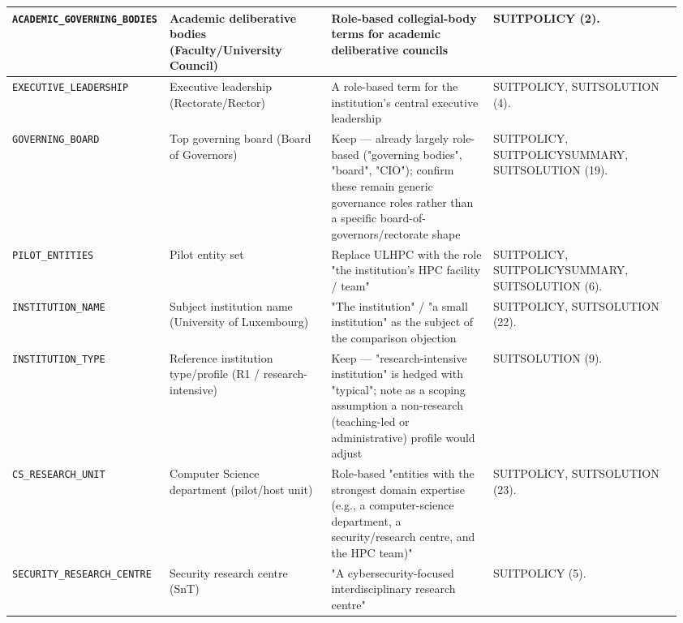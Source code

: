 \begin{center}
\begin{longtable}{@{}p{0.20\linewidth}p{0.24\linewidth}p{0.24\linewidth}p{0.28\linewidth}@{}}
\texttt{ACADEMIC\_GOVERNING\_BODIES} &
Academic deliberative bodies (Faculty/University Council) &
Role-based collegial-body terms for academic deliberative councils &
SUITPOLICY (2).\\
\midrule

\texttt{EXECUTIVE\_LEADERSHIP} &
Executive leadership (Rectorate/Rector) &
A role-based term for the institution's central executive leadership &
SUITPOLICY, SUITSOLUTION (4).\\
\midrule

\texttt{GOVERNING\_BOARD} &
Top governing board (Board of Governors) &
Keep --- already largely role-based ("governing bodies", "board", "CIO"); confirm these remain generic governance roles rather than a specific board-of-governors/rectorate shape &
SUITPOLICY, SUITPOLICYSUMMARY, SUITSOLUTION (19).\\
\midrule

\texttt{PILOT\_ENTITIES} &
Pilot entity set &
Replace ULHPC with the role "the institution's HPC facility / team" &
SUITPOLICY, SUITPOLICYSUMMARY, SUITSOLUTION (6).\\
\midrule

\texttt{INSTITUTION\_NAME} &
Subject institution name (University of Luxembourg) &
"The institution" / "a small institution" as the subject of the comparison objection &
SUITPOLICY, SUITSOLUTION (22).\\
\midrule

\texttt{INSTITUTION\_TYPE} &
Reference institution type/profile (R1 / research-intensive) &
Keep --- "research-intensive institution" is hedged with "typical"; note as a scoping assumption a non-research (teaching-led or administrative) profile would adjust &
SUITSOLUTION (9).\\
\midrule

\texttt{CS\_RESEARCH\_UNIT} &
Computer Science department (pilot/host unit) &
Role-based "entities with the strongest domain expertise (e.g., a computer-science department, a security/research centre, and the HPC team)" &
SUITPOLICY, SUITSOLUTION (23).\\
\midrule

\texttt{SECURITY\_RESEARCH\_CENTRE} &
Security research centre (SnT) &
"A cybersecurity-focused interdisciplinary research centre" &
SUITPOLICY (5).\\
\midrule


\end{longtable}
\end{center}
